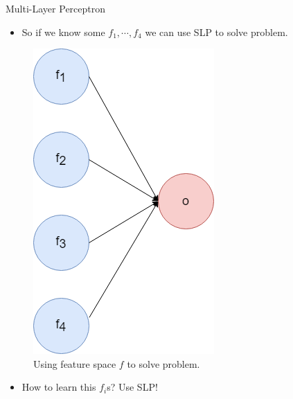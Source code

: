 \documentclass[compress,oilve,t]{beamer}
\begin{document}
\begin{frame}{Multi-Layer Perceptron}
	\begin{itemize}
		\item So if we know some $f_1, \cdots, f_4$ we can use SLP to solve problem.
	\end{itemize}
	\begin{figure}[H]
		\centering
		\includegraphics[height=0.45\textheight]{Figs/feature_space.png}
		\caption{Using feature space $f$ to solve problem.}
	\end{figure}
	\begin{itemize}
		\item How to learn this $f_i$s? Use SLP!
	\end{itemize}
\end{frame}
\end{document}
